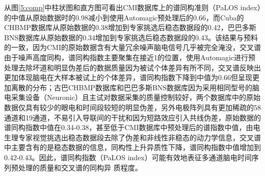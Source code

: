 从图\ref{5:comp}中柱状图和直方图可看出CMI数据库上的谱同构准则（PaLOS index）的中值从原始数据时的0.98减小到使用Automagic预处理后的0.66，而Cuba的CHBMP数据库从原始数据的0.38增加到专家挑选后稳态数据段的0.42，巴巴多斯BNS数据库从原始数据的0.34增加到专家挑选后稳态数据段的0.43。该结果与预料的一致，因为CMI的原始数据含有大量冗余噪声脑电信号几乎被完全淹没，交叉谱由于噪声高度同构，谱同构指数主要聚集在接近1的位置，使用Automagic进行预处理去除坏道和明显伪差后的数据质量因为被试个体差异有所不同，交叉谱反映出更加体现脑电在大样本被试上的个体差异，谱同构指数下降到中值为0.66但呈现更加离散的分布；古巴CHBMP数据库和巴巴多斯BNS数据库因为采用相同型号的脑电采集设备（Neuronic）且主试对数据采集的质量控制较好，两个数据库中的原始数据仅具有较少的眼电和时间段较短的明显伪差，另外电极阵列具有更加稀疏的58通道和19通道，不易引入导联间的干扰和因为短路效应引入共线伪差，原始数据的谱同构指数中值在0.34-0.38，甚至低于CMI数据库中预处理后的谱指数中值，由电生理专家视觉挑选出稳态数据段去除了伪差和非线性非稳态的动力学信息，交叉谱中主要含有的是稳态数据的信息，同构性上升异质性下降，谱同构指数中值增加到0.42-0.43。因此，谱同构指数（PaLOS index）可能有效地表征多通道脑电时间序列预处理的质量和交叉谱的同构异
质程度。

